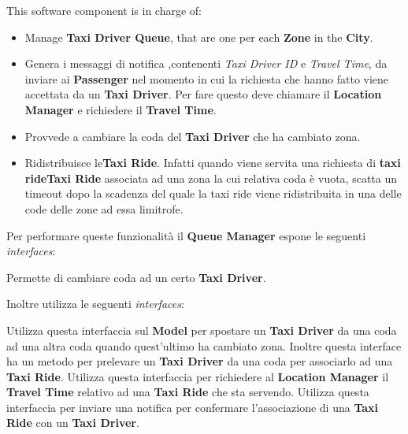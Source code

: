\begin{itemize}
\begin{itemize}
		 This software component is in charge of:
		\begin{itemize}
			\item Manage \textbf{Taxi Driver Queue}, that are one per each \textbf{Zone} in the \textbf{City}.
			\item Genera i messaggi di notifica ,contenenti \textit{Taxi Driver ID} e \textit{Travel Time}, da inviare ai \textbf{Passenger} nel momento in cui la richiesta che hanno fatto viene accettata da un \textbf{Taxi Driver}. 
			Per fare questo deve chiamare il \textbf{Location Manager} e richiedere il \textbf{Travel Time}.
			\item Provvede a cambiare la coda del \textbf{Taxi Driver} che ha cambiato zona.
			\item Ridistribuisce le\textbf{Taxi Ride}. Infatti quando viene servita una richiesta di \textbf{taxi rideTaxi Ride} associata ad una zona la cui relativa coda è vuota, scatta un timeout dopo la scadenza del quale la taxi ride viene ridistribuita in una delle code delle zone ad essa limitrofe.
		\end{itemize}
		Per performare queste funzionalità il \textbf{Queue Manager} espone le seguenti \textit{interfaces}:
		\begin{itemize}
			 Permette di cambiare coda ad un certo \textbf{Taxi Driver}.
		\end{itemize}
		Inoltre utilizza le seguenti \textit{interfaces}:
		\begin{itemize}
			 Utilizza questa interfaccia sul \textbf{Model} per spostare un \textbf{Taxi Driver} da una coda ad una altra coda quando quest'ultimo ha cambiato zona. 
			Inoltre questa interface ha un metodo per prelevare un \textbf{Taxi Driver} da una coda per associarlo ad una \textbf{Taxi Ride}.
			 Utilizza questa interfaccia per richiedere al \textbf{Location Manager} il \textbf{Travel Time} relativo ad una \textbf{Taxi Ride} che sta servendo.
			 Utilizza questa interfaccia per inviare una notifica per confermare l'associazione di una \textbf{Taxi Ride} con un \textbf{Taxi Driver}.
		\end{itemize}
		

\end{itemize}
\end{itemize}
